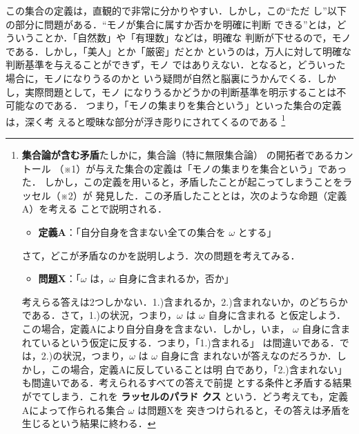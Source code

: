                 この集合の定義は，直観的で非常に分かりやすい．しかし，この“ただ
                し”以下の部分に問題がある．“モノが集合に属すか否かを明確に判断
                できる”とは，どういうことか．「自然数」や「有理数」などは，明確な
                判断が下せるので，モノである．しかし，「美人」とか「厳密」だとか
                というのは，万人に対して明確な判断基準を与えることができず，モノ
                ではありえない．となると，どういった場合に，モノになりうるのかと
                いう疑問が自然と脳裏にうかんでくる．しかし，実際問題として，モノ
                になりうるかどうかの判断基準を明示することは不可能なのである．
                つまり，「モノの集まりを集合という」といった集合の定義は，深く考
                えると曖昧な部分が浮き彫りにされてくるのである
                    \footnote{
                        \textbf{集合論が含む矛盾}\;\;\;たしかに，集合論（特に無限集合論）
                        の開拓者であるカントール
                        （※1）が与えた集合の定義は「モノの集まりを集合という」であった．
                        しかし，この定義を用いると，矛盾したことが起こってしまうことをラッセル（※2）が
                        発見した．この矛盾したこととは，次のような命題（定義A）を考える
                        ことで説明される．
                        \begin{itemize}
                            \item
                                \textbf{定義A}：「自分自身を含まない全ての集合を $\omega$ とする」
                        \end{itemize}

                        さて，どこが矛盾なのかを説明しよう．次の問題を考えてみる．
                        \begin{itemize}
                            \item
                                \textbf{問題X}：「$\omega$ は，$\omega$ 自身に含まれるか，否か」
                        \end{itemize}

                        考えらる答えは2つしかない．1.)含まれるか，2.)含まれないか，のどちらか
                        である．さて，1.)の状況，つまり，$\omega$ は $\omega$ 自身に含まれる
                        と仮定しよう．この場合，定義Aにより自分自身を含まない．しかし，いま，
                        $\omega$ 自身に含まれているという仮定に反する．つまり，「1.)含まれる」
                        は間違いである．では，2.)の状況，つまり，$\omega$ は $\omega$ 自身に含
                        まれないが答えなのだろうか．しかし，この場合，定義Aに反していることは明
                        白であり，「2.)含まれない」も間違いである．考えられるすべての答えで前提
                        とする条件と矛盾する結果がでてしまう．これを \textbf{ラッセルのパラド
                        クス} という．どう考えても，定義Aによって作られる集合 $\omega$ は問題Xを
                        突きつけられると，その答えは矛盾を生じるという結果に終わる．

}
